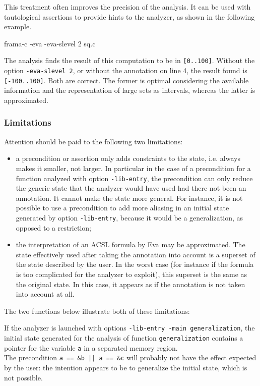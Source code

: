 \documentclass[web]{frama-c-book}
\newcommand{\Eva}{\textsf{Eva}}
\begin{document}
This treatment often improves the precision of the analysis. It can be used with tautological assertions
to provide hints to the analyzer, as shown in the following example.


\begin{shell}
frama-c -eva -eva-slevel 2 sq.c
\end{shell}

The analysis finds the result
of this computation to be in \lstinline|[0..100]|. Without the
option \lstinline|-eva-slevel 2|, or without the annotation on line 4, 
the result found
is \lstinline|[-100..100]|. Both are correct. The former is
optimal considering the available information and the representation
of large sets as intervals, whereas the latter is approximated.

\subsubsection{Limitations}

Attention should be paid to the following two limitations:
\begin{itemize}
\item a precondition or assertion only adds constraints to the state, i.e. always
makes it smaller, not larger. In particular in the case of a precondition for 
a function analyzed with option \lstinline|-lib-entry|, the precondition 
can only
reduce the generic state that the analyzer would have used had there
not been an annotation. It cannot make the state more general. For instance,
it is not possible to use a precondition to add more aliasing in
an initial state generated by option \lstinline|-lib-entry|,
because it would be a generalization, as opposed to a restriction;
\item the interpretation of an ACSL formula by \Eva{} may be
approximated. The state effectively used after taking the annotation
into account is a superset of
the state described by the user. In the worst case (for instance if
the formula is too complicated for the analyzer to exploit), this superset
is the same as the original state. In this case, 
it appears as if the annotation is
not taken into account at all.
\end{itemize}
\smallskip

The two functions below illustrate both of these limitations:

If the analyzer is launched with 
options \lstinline|-lib-entry -main generalization|,
the initial state generated for the analysis of function
\lstinline|generalization| contains a pointer for the variable \lstinline|a| in a separated memory region.\\
The precondition
\lstinline$a == &b || a == &c$ will probably not have the effect
expected by the user: the intention appears to be to generalize
the initial state, which is not possible.
\end{document}
